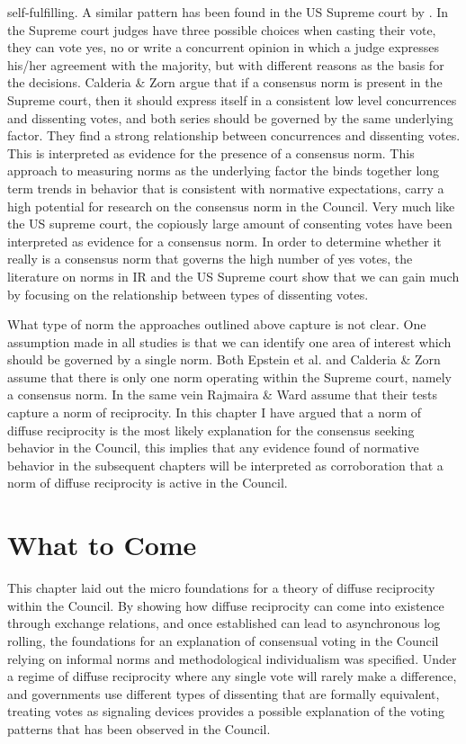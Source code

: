self-fulfilling. A similar pattern has been found in the US Supreme court by \citet{CalderiaZorn1998}. In the Supreme court judges have three possible choices when casting their vote, they can vote yes, no or write a concurrent opinion in which a judge expresses his/her agreement with the majority, but with different reasons as the basis for the decisions. Calderia \& Zorn argue that if a consensus norm is present in the Supreme court, then it should express itself in a consistent low level concurrences and dissenting votes, and both series should be governed by the same underlying factor. They find a strong relationship between concurrences and dissenting votes. This is interpreted as evidence for the presence of a consensus norm. This approach to measuring norms as the underlying factor the binds together long term trends in behavior that is consistent with normative expectations, carry a high potential for research on the consensus norm in the Council. Very much like the US supreme court, the copiously large amount of consenting votes have been interpreted as evidence for a consensus norm. In order to determine whether it really is a consensus norm that governs the high number of yes votes, the literature on norms in IR and the US Supreme court show that we can gain much by focusing on the relationship between types of dissenting votes. 

What type of norm the approaches outlined above capture is not clear. One assumption made in all studies is that we can identify one area of interest which should be governed by a single norm. Both Epstein et al. and Calderia \& Zorn assume that there is only one norm operating within the Supreme court, namely a consensus norm. In the same vein Rajmaira \& Ward assume that their tests capture a norm of reciprocity. In this chapter I have argued that a norm of diffuse reciprocity is the most likely explanation for the consensus seeking behavior in the Council,  this implies that any evidence found of normative behavior in the subsequent chapters will be interpreted as corroboration that a norm of diffuse reciprocity is active in the Council. 

\section{What to Come}
This chapter laid out the micro foundations for a theory of diffuse reciprocity within the Council. By showing how diffuse reciprocity can come into existence through exchange relations, and once established can lead to asynchronous log rolling, the foundations for an explanation of consensual voting in the Council relying on informal norms and methodological individualism was specified. Under a regime of diffuse reciprocity where any single vote will rarely make a difference, and governments use different types of dissenting that are formally equivalent, treating votes as signaling devices provides a possible explanation of the voting patterns that has been observed in the Council.  

